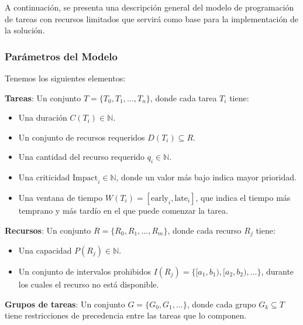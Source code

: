 \documentclass{article}
\begin{document}
A continuación, se presenta una descripción general del modelo de programación de tareas con recursos limitados que servirá como base para la implementación de la solución.

\subsubsection{Parámetros del Modelo}

Tenemos los siguientes elementos:

\textbf{Tareas}: Un conjunto \( T = \{T_0, T_1, \dots, T_n\} \), donde cada tarea \( T_i \) tiene:
  \begin{itemize}
    \item Una duración \( C(T_i) \in \mathbb{N} \).
    \item Un conjunto de recursos requeridos \( D(T_i) \subseteq R \).
    \item Una cantidad del recurso requerido \( q_i \in \mathbb{N} \).
    \item Una criticidad \( \text{Impact}_i \in \mathbb{N} \), donde un valor más bajo indica mayor prioridad.
    \item Una ventana de tiempo \( W(T_i) = [\text{early}_i, \text{late}_i] \), que indica el tiempo más temprano y más tardío en el que puede comenzar la tarea.
  \end{itemize}

\textbf{Recursos}: Un conjunto \( R = \{R_0, R_1, \dots, R_m\} \), donde cada recurso \( R_j \) tiene:
  \begin{itemize}
    \item Una capacidad \( P(R_j) \in \mathbb{N} \).
    \item Un conjunto de intervalos prohibidos \( I(R_j) = \{[a_1, b_1), [a_2, b_2), \dots\} \), durante los cuales el recurso no está disponible.
  \end{itemize}

\textbf{Grupos de tareas}: Un conjunto \( G = \{G_0, G_1, \dots\} \), donde cada grupo \( G_k \subseteq T \) tiene restricciones de precedencia entre las tareas que lo componen.

\vspace{0.5cm}
\end{document}
